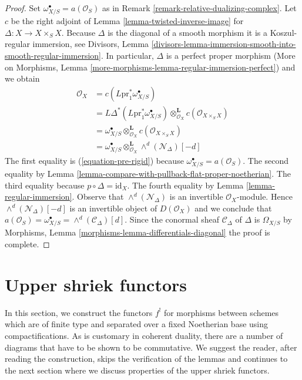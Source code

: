 \begin{proof}
Set $\omega_{X/S}^\bullet = a(\mathcal{O}_S)$ as in
Remark \ref{remark-relative-dualizing-complex}.
Let $c$ be the right adjoint of Lemma \ref{lemma-twisted-inverse-image} for
$\Delta : X \to X \times_S X$. Because $\Delta$
is the diagonal of a smooth morphism it is a
Koszul-regular immersion, see Divisors, Lemma
\ref{divisors-lemma-immersion-smooth-into-smooth-regular-immersion}.
In particular, $\Delta$ is a perfect proper morphism
(More on Morphisms, Lemma \ref{more-morphisms-lemma-regular-immersion-perfect})
and we obtain
\begin{align*}
\mathcal{O}_X
& =
c(L\text{pr}_1^*\omega_{X/S}^\bullet) \\
& =
L\Delta^*(L\text{pr}_1^*\omega_{X/S}^\bullet)
\otimes_{\mathcal{O}_X}^\mathbf{L}
c(\mathcal{O}_{X \times_S X}) \\
& =
\omega_{X/S}^\bullet \otimes_{\mathcal{O}_X}^\mathbf{L}
c(\mathcal{O}_{X \times_S X}) \\
& =
\omega_{X/S}^\bullet
\otimes_{\mathcal{O}_X}^\mathbf{L}
\wedge^d(\mathcal{N}_\Delta)[-d]
\end{align*}
The first equality is (\ref{equation-pre-rigid}) because
$\omega_{X/S}^\bullet = a(\mathcal{O}_S)$. The second equality by
Lemma \ref{lemma-compare-with-pullback-flat-proper-noetherian}.
The third equality because $p \circ \Delta = \text{id}_X$.
The fourth equality by Lemma \ref{lemma-regular-immersion}.
Observe that $\wedge^d(\mathcal{N}_\Delta)$ is an invertible
$\mathcal{O}_X$-module. Hence $\wedge^d(\mathcal{N}_\Delta)[-d]$
is an invertible object of $D(\mathcal{O}_X)$ and we conclude that
$a(\mathcal{O}_S) = \omega_{X/S}^\bullet = \wedge^d(\mathcal{C}_\Delta)[d]$.
Since the conormal sheaf $\mathcal{C}_\Delta$ of $\Delta$ is
$\Omega_{X/S}$ by
Morphisms, Lemma \ref{morphisms-lemma-differentials-diagonal}
the proof is complete.
\end{proof}







\section{Upper shriek functors}
\label{section-upper-shriek}

\noindent
In this section, we construct the functors $f^!$ for morphisms
between schemes which are of finite type and separated
over a fixed Noetherian base using compactifications.
As is customary in coherent duality, there are a number of diagrams
that have to be shown to be commutative. We suggest the reader,
after reading the construction, skips the verification of the
lemmas and continues to the next section where we discuss
properties of the upper shriek functors.

